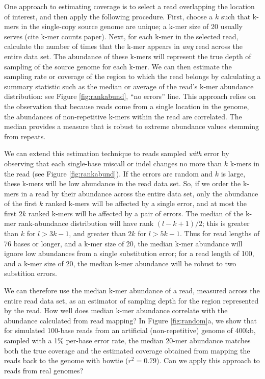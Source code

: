 \documentclass[10pt]{article}
\begin{document}
One approach to estimating coverage is to select a read overlapping
the location of interest, and then apply the following
procedure. First, choose a $k$ such that k-mers in the single-copy
source genome are unique; a k-mer size of 20 usually serves (cite
k-mer counts paper).  Next, for each k-mer in the selected read,
calculate the number of times that the k-mer appears in {\em any} read
across the entire data set.  The abundance of these k-mers will
represent the true depth of sampling of the source genome for each
k-mer.  We can then estimate the sampling rate or coverage of the
region to which the read belongs by calculating a summary statistic
such as the median or average of the read's k-mer abundance
distribution: see Figure \ref{fig:rankabund}, ``no errors'' line. This
approach relies on the observation that because reads come from a
single location in the genome, the abundances of non-repetitive k-mers
within the read are correlated.  The median provides a measure that
is robust to extreme abundance values stemming from repeats.

We can extend this estimation technique to reads sampled {\em with}
error by observing that each single-base miscall or indel changes no
more than $k$ k-mers in the read (see Figure \ref{fig:rankabund}).  If
the errors are random and $k$ is large, these k-mers will be low
abundance in the read data set.  So, if we order the k-mers in a read
by their abundance across the entire data set, only the abundance of
the first $k$ ranked k-mers will be affected by a single error, and at
most the first $2k$ ranked k-mers will be affected by a pair of
errors.  The median of the k-mer rank-abundance distribution will have
rank $(l - k + 1) / 2$; this is greater than $k$ for $l > 3k-1$, and
greater than $2k$ for $l > 5k-1$.  Thus for read lengths of 76 bases
or longer, and a k-mer size of 20, the median k-mer abundance will
ignore low abundances from a single substitution error; for a read
length of 100, and a k-mer size of 20, the median k-mer abundance will
be robust to two substition errors.

We can therefore use the median k-mer abundance of a read, measured
across the entire read data set, as an estimator of sampling depth for
the region represented by the read. How well does median k-mer
abundance correlate with the abundance calculated from read mapping?
In Figure \ref{fig:random}a, we show that for simulated 100-base reads
from an artificial (non-repetitive) genome of 400kb, sampled with a
1\% per-base error rate, the median 20-mer abundance matches both the
true coverage and the estimated coverage obtained from mapping the
reads back to the genome with bowtie ($r^2 = 0.79$).  Can we apply
this approach to reads from real genomes?
\end{document}
